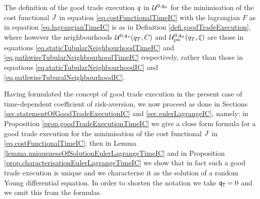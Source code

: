\documentclass[10pt,a4paper]{article}
\begin{document}
	The definition of the good trade execution $q$ in $\mathcal{U}^{0,\mathfrak{q_0}}$ for the minimisation of the cost functional $J$ in equation \eqref{eq.costFunctionalTimeIC} with the lagrangian $F$ as in equation \eqref{eq.lagrangianTimeIC} is as in Definition \ref{defi.goodTradeExecution}, where however the neighbourhoods $\mathcal{U}^{0,\mathfrak{q_0}} (q_T, C)$ and $\mathcal{U}^{0,\mathfrak{q_0}}_{\text{pw}}(q_T,\xi)$ are those in equations \eqref{eq.staticTubularNeighbourhoodTimeIC} and \eqref{eq.pathwiseTubularNeighbourhoodTimeIC} respectively, rather than those in equations \eqref{eq.staticTubularNeighbourhoodIC} and \eqref{eq.pathwiseTuburalNeighbourhoodIC}.
	
	Having formulated the concept of good trade execution in the present case of time-dependent coefficient of risk-aversion, we now proceed as done in Sections \ref{sec.statementOfGoodTradeExecutionIC} and \ref{sec.eulerLagrangeIC}, namely: in Proposition \ref{prop.goodTradeExecutionTimeIC} we give a close form formula for a good trade execution for the minimisation of the cost functional $J$ in \eqref{eq.costFunctionalTimeIC}; then in Lemma \ref{lemma.uniquenessOfSolutionEulerLagrangeTimeIC} and in Proposition \ref{prop.characterisationEulerLagrangeTimeIC} we show that in fact such a good trade execution is unique and we characterise it as the solution of a random Young differential equation. In order to shorten the notation we take $\mathfrak{q}_{\mathtt{T} } = 0$ and we omit this from the formulas. 
	
\end{document}
